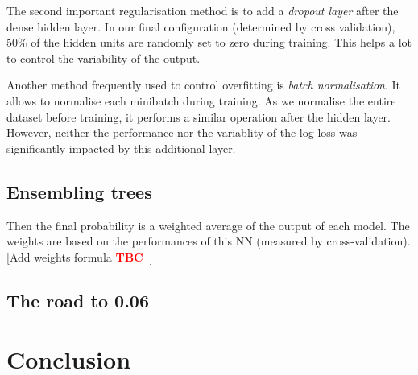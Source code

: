 \documentclass[a4paper,11pt,openany,extrafontsizes,oneside,article]{memoir}
\newcommand{\RP}{\textcolor{red}{\large{\textbf{TBC~}}}}
\begin{document}
The second important regularisation method is to add a \emph{dropout
  layer} after the dense hidden layer. In our final configuration
(determined by cross validation), 50\% of the hidden units are
randomly set to zero during training. This helps a lot to control the
variability of the output.

Another method frequently used to control overfitting is \emph{batch
  normalisation}. It allows to normalise each minibatch during
training. As we normalise the entire dataset before training, it
performs a similar operation after the hidden layer. However, neither
the performance nor the variablity of the log loss was significantly
impacted by this additional layer.

\section{Ensembling trees}

Then the final probability is a weighted average of the output of each
model. The weights are based on the performances of this NN (measured
by cross-validation).  [Add weights formula \RP]

\section{The road to 0.06}
    
\chapter{Conclusion}




\backmatter%





% 
\end{document}
